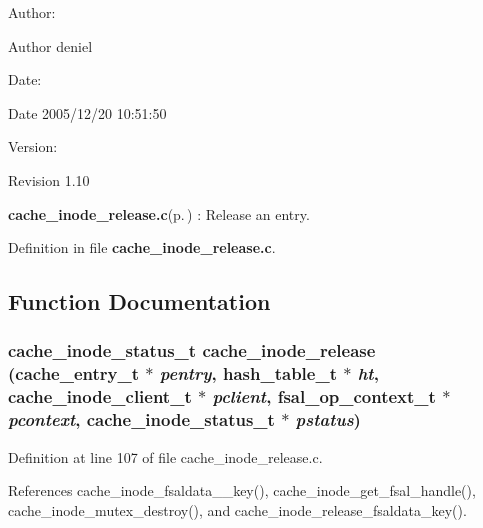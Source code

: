 \begin{Desc}
\item[Author:]\begin{Desc}
\item[Author]deniel \end{Desc}
\end{Desc}
\begin{Desc}
\item[Date:]\begin{Desc}
\item[Date]2005/12/20 10:51:50 \end{Desc}
\end{Desc}
\begin{Desc}
\item[Version:]\begin{Desc}
\item[Revision]1.10 \end{Desc}
\end{Desc}
{\bf cache\_\-inode\_\-release.c}{\rm (p.\,\pageref{cache__inode__release_8c})} : Release an entry.

Definition in file {\bf cache\_\-inode\_\-release.c}.

\subsection{Function Documentation}
\subsubsection{\setlength{\rightskip}{0pt plus 5cm}cache\_\-inode\_\-status\_\-t cache\_\-inode\_\-release (cache\_\-entry\_\-t $\ast$ {\em pentry}, hash\_\-table\_\-t $\ast$ {\em ht}, cache\_\-inode\_\-client\_\-t $\ast$ {\em pclient}, fsal\_\-op\_\-context\_\-t $\ast$ {\em pcontext}, cache\_\-inode\_\-status\_\-t $\ast$ {\em pstatus})}\label{cache__inode__release_8c_a0}




Definition at line 107 of file cache\_\-inode\_\-release.c.

References cache\_\-inode\_\-fsaldata\_\_\-key(), cache\_\-inode\_\-get\_\-fsal\_\-handle(), cache\_\-inode\_\-mutex\_\-destroy(), and cache\_\-inode\_\-release\_\-fsaldata\_\-key().